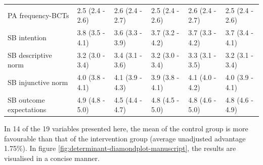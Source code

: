 \documentclass[english,man,floatsintext]{apa6}
\begin{document}
\begin{table}[tbp]
\begin{center}
\begin{threeparttable}
\begin{tabular}{llllll}
PA frequency-BCTs & 2.5 (2.4 - 2.6) & 2.6 (2.4 - 2.7) & 2.5 (2.4 - 2.6) & 2.6 (2.4 - 2.7) & 2.5 (2.4 - 2.6)\\
SB intention & 3.8 (3.5 - 4.1) & 3.6 (3.3 - 3.9) & 3.7 (3.2 - 4.2) & 3.7 (3.3 - 4.2) & 3.7 (3.4 - 4.1)\\
SB descriptive norm & 3.2 (3.0 - 3.4) & 3.4 (3.1 - 3.6) & 3.2 (3.0 - 3.4) & 3.3 (3.1 - 3.5) & 3.2 (3.1 - 3.4)\\
SB injunctive norm & 4.0 (3.8 - 4.1) & 4.1 (3.9 - 4.3) & 3.9 (3.8 - 4.1) & 4.1 (4.0 - 4.2) & 4.0 (3.9 - 4.1)\\
SB outcome expectations & 4.9 (4.8 - 5.0) & 4.5 (4.4 - 4.7) & 4.8 (4.5 - 5.0) & 4.8 (4.6 - 5.0) & 4.8 (4.6 - 4.9)\\
\bottomrule
\end{tabular}
\end{threeparttable}
\end{center}
\end{table}

In 14 of the 19 variables presented here, the mean of the control group is more favourable than that of the intervention group (average unadjusted advantage 1.75\%). In figure \ref{fig:determinant-diamondplot-manuscript}, the results are visualised in a concise manner.
\end{document}
